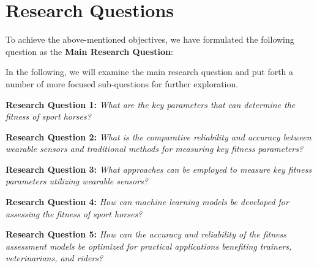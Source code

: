\section{Research Questions}
\label{sec:intro_research_objective}

To achieve the above-mentioned objectives, we have formulated the following question as the \textbf{Main Research Question}:

\mainrq

In the following, we will examine the main research question and put forth a number of more focused sub-questions for further exploration.


\vspace{0.25cm}
\noindent\textbf{Research Question 1: }\textit{What are the key parameters that can determine the fitness of sport horses?}

\vspace{0.25cm}

\noindent\textbf{Research Question 2: }\textit{What is the comparative reliability and accuracy between wearable sensors and traditional methods for measuring key fitness parameters?}

\vspace{0.25cm}

\noindent\textbf{Research Question 3: }\textit{What approaches can be employed to measure key fitness parameters utilizing wearable sensors?}

\vspace{0.25cm}

\noindent\textbf{Research Question 4: }\textit{How can machine learning models be developed for assessing the fitness of sport horses?}

\vspace{0.25cm}

\noindent\textbf{Research Question 5: }\textit{How can the accuracy and reliability of the fitness assessment models be optimized for practical applications benefiting trainers, veterinarians, and riders?}